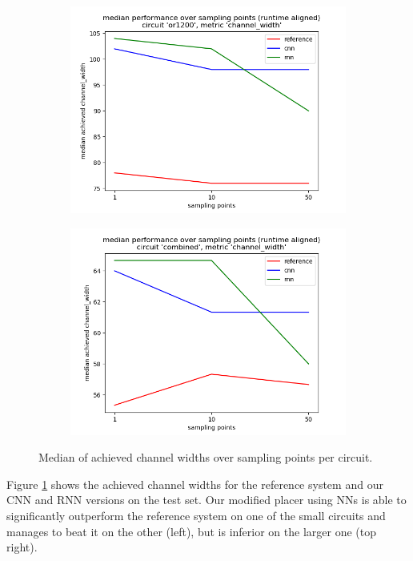 \begin{figure}
\begin{subfigure}[b]{0.45\linewidth}
	\end{subfigure}
	\begin{subfigure}[b]{0.45\linewidth}
		\includegraphics[width=\linewidth]{plots/eval-or1200-chan-width-median.png}
	\end{subfigure}
	\begin{subfigure}[b]{0.45\linewidth}
		\includegraphics[width=\linewidth]{plots/eval-combined-chan-width-median.png}
	\end{subfigure}
	\caption{Median of achieved channel widths over sampling points per circuit.}
	\label{fig:eval-chan-width-median}
\end{figure}

Figure \ref{fig:eval-chan-width-median} shows the achieved channel widths for the reference system and our \gls{CNN} and \gls{RNN} versions on the test set. Our modified placer using \glspl{NN} is able to significantly outperform the reference system on one of the small circuits and manages to beat it on the other (left), but is inferior on the larger one (top right). 

